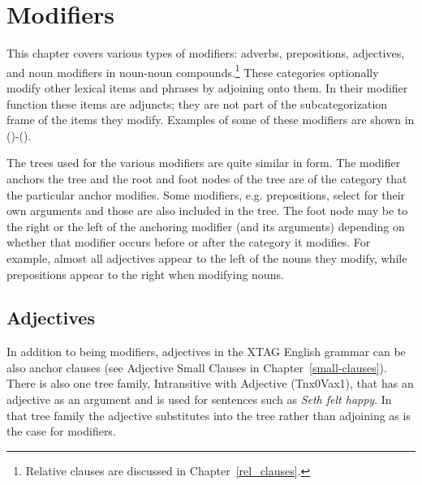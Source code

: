 \chapter{Modifiers}
\label{modifiers}

This chapter covers various types of modifiers: adverbs, prepositions,
adjectives, and noun modifiers in noun-noun compounds.\footnote{Relative
clauses are discussed in Chapter~\ref{rel_clauses}.}  These categories
optionally modify other lexical items and phrases by adjoining onto them.  In
their modifier function these items are adjuncts; they are not part of the
subcategorization frame of the items they modify.  Examples of some of these
modifiers are shown in ()-().




The trees used for the various modifiers are quite similar in form.
The modifier anchors the tree and the root and foot nodes of the tree
are of the category that the particular anchor modifies. Some
modifiers, e.g. prepositions, select for their own arguments and those
are also included in the tree.  The foot node may be to the right or
the left of the anchoring modifier (and its arguments) depending on
whether that modifier occurs before or after the category it
modifies. For example, almost all adjectives appear to the left of the
nouns they modify, while prepositions appear to the right when
modifying nouns.


\section{Adjectives}
\label{adj-modifier}

In addition to being modifiers, adjectives in the XTAG English grammar can be
also anchor clauses (see Adjective Small Clauses in
Chapter~\ref{small-clauses}).  There is also one tree family, Intransitive with
Adjective (Tnx0Vax1), that has an adjective as an argument and is used for
sentences such as {\it Seth felt happy}. In that tree family the adjective
substitutes into the tree rather than adjoining as is the case for modifiers.


